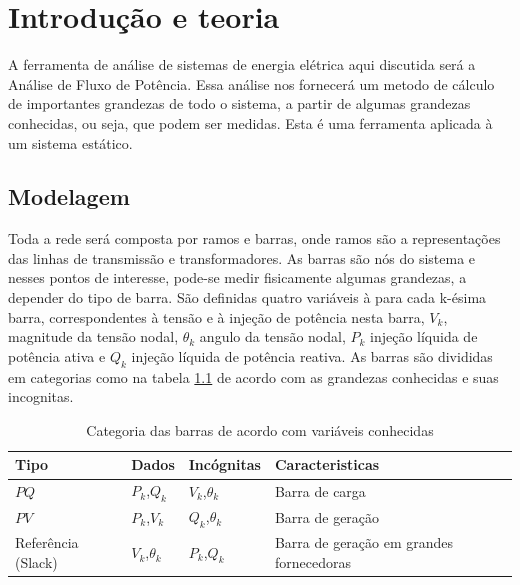 \chapter{Introdu\c{c}\~ao e teoria}





A ferramenta de an\'alise de sistemas de energia el\'etrica aqui discutida ser\'a a An\'alise de Fluxo de Pot\^encia. Essa an\'alise nos fornecer\'a um metodo de cálculo de importantes grandezas de todo o sistema, a partir de algumas grandezas conhecidas, ou seja, que podem ser medidas. Esta \'e uma ferramenta aplicada \`a um sistema est\'atico.  \cite{monticelli}
\section{Modelagem}
\label{SectionIntro}
Toda a rede ser\'a composta por ramos e barras, onde ramos s\~ao a representa\c{c}\~oes das linhas de transmiss\~ao e transformadores. As barras s\~ao n\'os do sistema e nesses pontos de interesse, pode-se medir fisicamente algumas grandezas, a depender do tipo de barra. S\~ao definidas quatro vari\'aveis \`a para cada k-ésima barra, correspondentes \`a tens\~ao e \`a inje\c{c}\~ao de
pot\^encia nesta barra, $V_k$, magnitude da tens\~ao nodal, $\theta_k$ angulo da tens\~ao nodal, $P_k$ inje\c{c}\~ao l\'iquida de pot\^encia ativa e $Q_k$ inje\c{c}\~ao l\'iquida de pot\^encia reativa. As barras s\~ao divididas em categorias como na tabela \ref{t_PQPVSlack} de acordo com as grandezas conhecidas e suas incognitas.
\begin{table}[]
\caption{Categoria das barras de acordo com variáveis conhecidas}
\begin{tabular}{@{}llll@{}}
\toprule
Tipo & Dados & Incógnitas & Caracteristicas \\ 
\midrule
$PQ$ & $P_k$,$Q_k$ & $V_k$,$\theta_k$  & Barra de carga \\
$PV$ & $P_k$,$V_k$ & $Q_k$,$\theta_k$  & Barra de geração\\
Referência (Slack) & $V_k$,$\theta_k$ & $P_k$,$Q_k$& Barra de geração em grandes fornecedoras \\ \bottomrule
\end{tabular}
\label{t_PQPVSlack}
\end{table}



